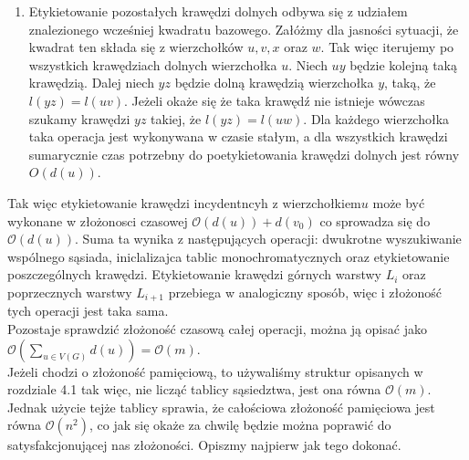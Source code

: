 \documentclass[12pt,a4paper,titlepage]{article}
\begin{document}
\begin{enumerate}
\begin{enumerate}[a)]
\end{enumerate} 
\item
Etykietowanie pozostałych krawędzi dolnych odbywa się z udziałem znalezionego wcześniej kwadratu bazowego. Załóżmy dla jasności sytuacji, że kwadrat ten składa się z wierzchołków $u,v,x$ oraz $w$. Tak więc iterujemy po wszystkich krawędziach dolnych wierzchołka $u$. Niech $uy$ będzie kolejną taką krawędzią. Dalej niech $yz$ będzie dolną krawędzią wierzchołka $y$, taką, że $l(yz)=l(uv)$. Jeżeli okaże się że taka krawędź nie istnieje wówczas szukamy krawędzi $yz$ takiej, że $l(yz)=l(uw)$. Dla każdego wierzchołka taka operacja jest wykonywana w czasie stałym, a dla wszystkich krawędzi sumarycznie czas potrzebny do poetykietowania krawędzi dolnych jest równy $O(d(u))$. \\
\end{enumerate}
Tak więc etykietowanie krawędzi incydentncyh z wierzchołkiem$u$ może być wykonane w złożonosci czasowej $\mathcal{O}(d(u)) + d(v_0)$ co sprowadza się do $\mathcal{O}(d(u)) $. Suma ta wynika z następujących operacji: dwukrotne wyszukiwanie wspólnego sąsiada, iniclalizajca tablic monochromatycznych oraz etykietowanie poszczególnych krawędzi.
Etykietowanie krawędzi górnych warstwy $L_i$ oraz poprzecznych warstwy $L_{i+1}$ przebiega w analogiczny sposób, więc i złożoność tych operacji jest taka sama.\\
Pozostaje sprawdzić złożoność czasową całej operacji, można ją opisać jako \\
$\mathcal{O}(\sum _{u \in V(G)} d(u)) = \mathcal{O}(m)$.\\
Jeżeli chodzi o złożoność pamięciową, to używaliśmy struktur opisanych w rozdziale 4.1 tak więc, nie licząć tablicy sąsiedztwa, jest ona równa $\mathcal{O}(m)$. Jednak użycie tejże tablicy sprawia, że całościowa złożoność pamięciowa jest równa $\mathcal{O}(n^2)$, co jak się okaże za chwilę będzie można poprawić do satysfakcjonującej nas złożoności. Opiszmy najpierw jak tego dokonać.\\
\end{document}
